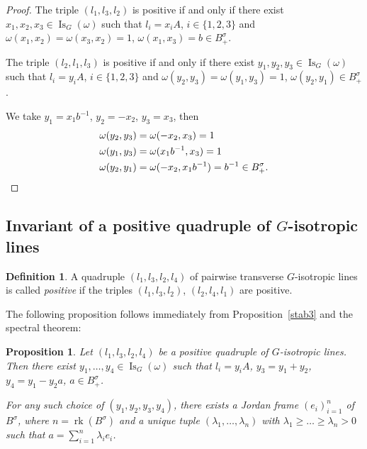 \documentclass[a4paper,oneside,11pt]{amsart}
\DeclareMathOperator{\rk}{rk}
\DeclareMathOperator{\Is}{Is}
\theoremstyle{plain}
\newtheorem{prop}[teo]{Proposition}
\theoremstyle{definition}
\newtheorem{df}[teo]{Definition}
\theoremstyle{remark}
\newcommand{\defin}{\emph}
\begin{document}
\begin{proof}
The triple $(l_1,l_3,l_2)$ is positive if and only if there exist $x_1,x_2,x_3\in\Is_G(\omega)$ such that $l_i=x_iA$, $i\in\{1,2,3\}$ and $\omega(x_1,x_2)=\omega(x_3,x_2)=1$, $\omega(x_1,x_3)=b\in B^{\sigma}_+$.

The triple $(l_2,l_1,l_3)$ is positive if and only if there exist $y_1,y_2,y_3\in\Is_G(\omega)$ such that $l_i=y_iA$, $i\in\{1,2,3\}$ and $\omega(y_2,y_3)=\omega(y_1,y_3)=1$, $\omega(y_2,y_1)\in B^{\sigma}_+$.

We take $y_1=x_1b^{-1}$, $y_2=-x_2$, $y_3=x_3$, then 
\begin{align*}
    \omega(y_2,y_3)& =\omega(-x_2,x_3)=1\\
    \omega(y_1,y_3)& =\omega(x_1b^{-1},x_3)=1\\
    \omega(y_2,y_1)& =\omega(-x_2,x_1b^{-1})=b^{-1}\in B^{\sigma}_+.   \qedhere
\end{align*}
\end{proof}


\subsection{Invariant of a positive quadruple of \texorpdfstring{$G$}{G}-isotropic lines}\label{pos_quadr}

\begin{df}
A quadruple $(l_1,l_3,l_2,l_4)$ of pairwise transverse $G$-isotropic lines is called \defin{positive} if the triples $(l_1,l_3,l_2)$, $(l_2,l_4,l_1)$ are positive.
\end{df}

The following proposition follows immediately from Proposition~\ref{stab3} and the spectral theorem:

\begin{prop}\label{diagon} Let $(l_1,l_3,l_2,l_4)$ be a positive quadruple of $G$-isotropic lines. Then there exist $y_1,\dots,y_4\in \Is_G(\omega)$ such that $l_i=y_iA$, $y_3=y_1+y_2$, $y_4=y_1-y_2a$, $a\in B^{\sigma}_+$.

For any such choice of $(y_1,y_2,y_3,y_4)$, there exists a Jordan frame $(e_i)_{i=1}^n$ of $B^{\sigma}$, where $n=\rk(B^{\sigma})$ and a unique tuple $(\lambda_1,\dots,\lambda_n)$ with $\lambda_1\geq\dots\geq\lambda_n>0$ such that $a=\sum_{i=1}^n\lambda_ie_i$.
\end{prop}
\end{document}
